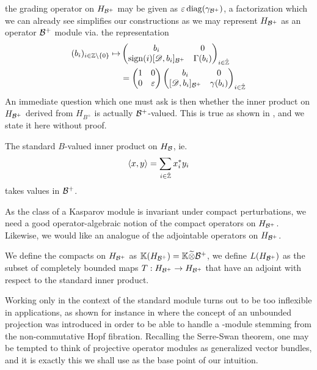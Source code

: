 the grading operator on $H_{\mathcal{B}^+}$ may be given as $\varepsilon \operatorname{diag}(\gamma_{\mathcal{B}^+})$, a factorization which we can already see simplifies our constructions as we may represent $H_{\mathcal{B}^+}$ as an operator $\mathcal{B}^+$ module via. the representation 
\begin{align*}
	(b_i)_{i\in \Z\setminus \{0\}}\mapsto &\begin{pmatrix} b_i & 0 \\ \sign(i)[\D,b_i]_{\B^+} & \Gamma(b_i) \end{pmatrix}_{i\in \Zred} \\
	&=\begin{pmatrix} 1 & 0 \\ 0 & \epsilon \end{pmatrix} \begin{pmatrix} b_i & 0 \\ [\D,b_i]_{\B^+} & \gamma(b_i) \end{pmatrix}_{i\in \Zred}
\end{align*}
An immediate question which one must ask is then whether the inner product on $H_{\mathcal{B}^+}$ derived from $H_{B^+}$ is actually $\mathcal{B}^+$-valued. This is true as shown in \cite{mesland}, and we state it here without proof. 
\begin{proposition}
	The standard $B$-valued inner product on $H_{\mathcal{B}}$, ie. 
	\begin{align*}
		\left \langle x,y \right \rangle=\sum_{i\in \hat{\mathbb{Z}}} x_i^* y_i
	\end{align*}
	takes values in $\mathcal{B}^+$.
\end{proposition}
As the class of a Kasparov module is invariant under compact perturbations, we need a good operator-algebraic notion of the compact operators on $H_{\mathcal{B}^+}$. Likewise, we would like an analogue of the adjointable operators on $H_{\mathcal{B}^+}$. 
\begin{definition}
	We define the compacts on $H_{\mathcal{B}^+}$ as  $\mathbb{K}(H_{\mathcal{B}^+})=\mathbb{K}\widetilde{\otimes} \mathcal{B}^+$, we define $L(H_{\mathcal{B}^+})$ as the subset of completely bounded maps $T:H_{\mathcal{B}^+}\to H_{\mathcal{B}^+}$ that have an adjoint with respect to the standard inner product. 
\end{definition}
Working only in the context of the standard module turns out to be too inflexible in applications, as shown for instance in \cite{suijlekom} where the concept of an unbounded projection was introduced in order to be able to handle a \Cstar-module stemming from the non-commutative Hopf fibration. Recalling the Serre-Swan theorem, one may be tempted to think of projective operator modules as generalized vector bundles, and it is exactly this we shall use as the base point of our intuition.  
